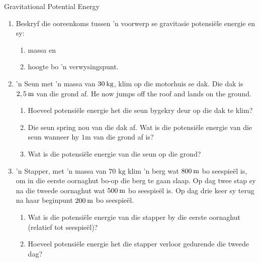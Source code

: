 \begin{exercises}{Gravitational Potential Energy }
            \nopagebreak
      \label{m38784*id66588}\begin{enumerate}[noitemsep, label=\textbf{\arabic*}. ] 
            \label{m38784*uid50}\item Beskryf die ooreenkoms tussen   'n voorwerp se gravitasie potensi\"{e}le energie en sy:
\label{m38784*id66604}\begin{enumerate}[noitemsep, label=\textbf{\alph*}. ] 
            \label{m38784*uid51}\item massa en 
\label{m38784*uid52}\item hoogte bo   'n verwysingspunt.
\end{enumerate}
                \label{m38784*uid53}\item   'n Seun met   'n massa van $30\phantom{\rule{2pt}{0ex}}\text{kg}$, klim op die motorhuis se dak. Die dak is $2,5\phantom{\rule{2pt}{0ex}}\text{m}$ van die grond af. He now jumps off the roof and lands on the ground.
\label{m38784*id66646}\begin{enumerate}[noitemsep, label=\textbf{\alph*}. ] 
            \label{m38784*uid54}\item Hoeveel potensi\"{e}le energie het die seun bygekry deur op die dak te klim?
\label{m38784*uid55}\item Die seun spring nou van die dak af. Wat is die potensi\"{e}le energie van die seun wanneer hy $1 \text{m}$ van die grond af is?
\label{m38784*uid56}\item Wat is die potensi\"{e}le energie van die seun op die grond?
\end{enumerate}
                \label{m38784*uid57}\item   'n Stapper, met   'n massa van $70 \text{ kg}$ klim   'n berg wat $800\phantom{\rule{2pt}{0ex}}\text{m}$ bo seespie\"{e}l is, om in die eerste oornaghut bo-op die berg te gaan slaap. Op dag twee stap sy na die tweede oornaghut wat $500\phantom{\rule{2pt}{0ex}}\text{m}$ bo seespie\"{e}l is. Op dag drie keer sy terug na haar beginpunt $200\phantom{\rule{2pt}{0ex}}\text{m}$ bo seespie\"{e}l.
\label{m38784*id66702}\begin{enumerate}[noitemsep, label=\textbf{\alph*}. ] 
            \label{m38784*uid58}\item Wat is die potensi\"{e}le energie van die stapper by die eerste oornaghut (relatief tot seespie\"{e}l)?
\label{m38784*uid59}\item Hoeveel potensi\"{e}le energie het die stapper verloor gedurende die tweede dag?

\end{enumerate}
\end{enumerate}
\end{exercises}
